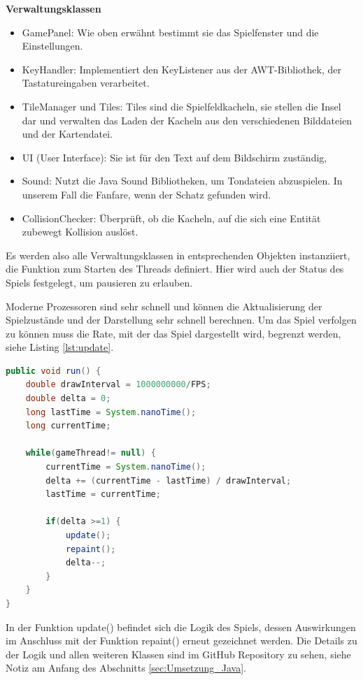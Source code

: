 \documentclass[
	12pt, %
	a4paper,
	listof=totoc, %
	bibliography=totoc, %
	numbers=noenddot, %
	ngerman, %
	headsepline, %
	oneside %
	]{scrbook} %
\begin{document}
\textbf{Verwaltungsklassen}
\begin{itemize}\vspace{-1em}
\setlength{\itemsep}{-1em}
	\item GamePanel: Wie oben erwähnt bestimmt sie das Spielfenster und die Einstellungen.
	\item KeyHandler: Implementiert den KeyListener aus der AWT-Bibliothek, der Tastatureingaben verarbeitet.
	\item TileManager und Tiles: Tiles sind die Spielfeldkacheln, sie stellen die Insel dar und verwalten das Laden der Kacheln aus den verschiedenen Bilddateien und der Kartendatei.
	\item UI (User Interface): Sie ist für den Text auf dem Bildschirm zuständig,
	\item Sound: Nutzt die Java Sound Bibliotheken, um Tondateien abzuspielen. In unserem Fall die Fanfare, wenn der Schatz gefunden wird.
	\item CollisionChecker: Überprüft, ob die Kacheln, auf die sich eine Entität zubewegt Kollision auslöst.
\end{itemize}

Es werden also alle Verwaltungsklassen in entsprechenden Objekten instanziiert, die Funktion zum Starten des Threads definiert. Hier wird auch der Status des Spiels festgelegt, um pausieren zu erlauben.

Moderne Prozessoren sind sehr schnell und können die Aktualisierung der Spielzustände und der Darstellung sehr schnell berechnen. Um das Spiel verfolgen zu können muss die Rate, mit der das Spiel dargestellt wird, begrenzt werden, siehe Listing \ref{lst:update}.

\begin{lstlisting}[language=Java, caption=Beschränkung der Aktualisierungen, label={lst:update}]
public void run() {
	double drawInterval = 1000000000/FPS;
	double delta = 0;
	long lastTime = System.nanoTime();
	long currentTime;
	
	while(gameThread!= null) {
		currentTime = System.nanoTime();
		delta += (currentTime - lastTime) / drawInterval;
		lastTime = currentTime;
		
		if(delta >=1) {
			update();
			repaint();
			delta--;
		}
	}
}
\end{lstlisting}

In der Funktion update() befindet sich die Logik des Spiels, dessen Auswirkungen im Anschluss mit der Funktion repaint() erneut gezeichnet werden.  
Die Details zu der Logik und allen weiteren Klassen sind im GitHub Repository zu sehen, siehe Notiz am Anfang des Abschnitts \ref{sec:Umsetzung_Java}.
\end{document}
